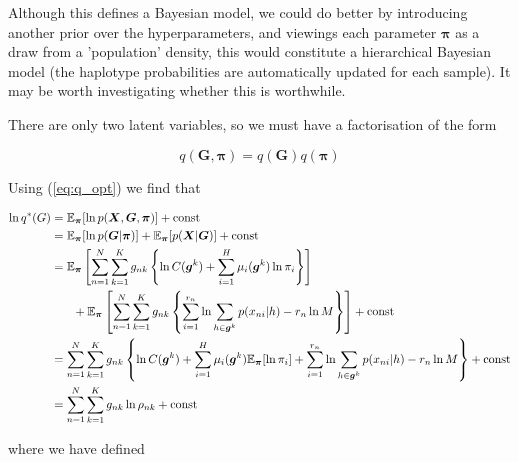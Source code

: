 \documentclass{article}
\begin{document}
Although this defines a Bayesian model, we could do better by introducing another prior over the hyperparameters, and viewings each parameter $\boldsymbol{\pi}$ as a draw from a 'population' density, this would constitute a hierarchical Bayesian model (the haplotype probabilities are automatically updated for each sample). It may be worth investigating whether this is worthwhile. 

There are only two latent variables, so we must have a factorisation of the form

\begin{equation}
q(\boldsymbol{G}, \boldsymbol{\pi}) = q(\boldsymbol{G})q(\boldsymbol{\pi})
\end{equation}

Using (\ref{eq:q_opt}) we find that

\begin{align}
    \ln q^*(G) &= \mathbb{E}_{\boldsymbol{\pi}}[\ln p(\boldsymbol{X}, \boldsymbol{G}, \boldsymbol{\pi})] + \text{const}\notag\\
    &= \mathbb{E}_{\boldsymbol{\pi}}[\ln p(\boldsymbol{G} | \boldsymbol{\pi})] + \mathbb{E}_{\boldsymbol{\pi}}[p(\boldsymbol{X} | \boldsymbol{G})] + \text{const} \notag\\
    &= \mathbb{E}_{\boldsymbol{\pi}}\left[ \sum_{n = 1}^N \sum_{k = 1}^K g_{nk} \left\{ \ln C(\boldsymbol{g}^k) + \sum_{i = 1}^H \mu_i(\boldsymbol{g}^k) \ln \pi_i \right\} \right] \notag\\ &\phantom{{}=1} + \mathbb{E}_{\boldsymbol{\pi}}\left[ \sum_{n = 1}^N \sum_{k = 1}^K g_{nk} \left\{ \sum_{i = 1}^{r_n} \ln \sum_{h \in \boldsymbol{g}^k} p(x_{ni} | h) - r_n \ln M \right\} \right] + \text{const}\notag\\
    &= \sum_{n = 1}^N \sum_{k = 1}^K g_{nk} \left\{ \ln C(\boldsymbol{g}^k) + \sum_{i = 1}^H \mu_i(\boldsymbol{g}^k) \mathbb{E}_{\boldsymbol{\pi}}[\ln \pi_i] + \sum_{i = 1}^{r_n} \ln \sum_{h \in \boldsymbol{g}^k} p(x_{ni} | h) - r_n \ln M \right\} + \text{const}\notag\\
    &= \sum_{n = 1}^N \sum_{k = 1}^K g_{nk} \ln \rho_{nk} + \text{const}
\end{align}

where we have defined
\end{document}
